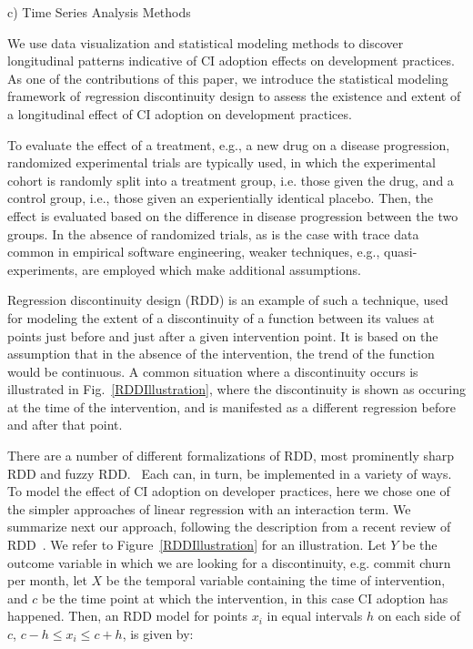c) Time Series Analysis Methods

We use data visualization and statistical modeling methods to discover longitudinal patterns indicative of CI adoption effects on development practices.
As one of the contributions of this paper, we introduce the statistical modeling framework of {\emph regression discontinuity design} to assess the existence and extent of a longitudinal effect of CI adoption on development practices.

To evaluate the effect of a treatment, e.g., a new drug on a disease progression, randomized experimental trials are typically used, in which the experimental cohort is randomly split into a treatment group, i.e. those given the drug, and a control group, i.e., those given an experientially identical placebo. Then, the effect is evaluated based on the difference in disease progression between the two groups.
In the absence of randomized trials, as is the case with trace data common in empirical software engineering, weaker techniques, e.g., quasi-experiments, are employed which make additional assumptions.

Regression discontinuity design (RDD) is an example of such a technique, used for modeling the extent of a discontinuity of a function between its values at points just before and just after a given intervention point. 
It is based on the assumption that in the absence of the intervention, the trend of the function would be continuous.
A common situation where a discontinuity occurs is illustrated in Fig.~\ref{RDDIllustration}, where the discontinuity is shown as occuring at the time of the intervention, and is manifested as a different regression before and after that point.

There are a number of different formalizations of RDD, most prominently sharp RDD and fuzzy RDD.~\cite{}
Each can, in turn, be implemented in a variety of ways.
To model the effect of CI adoption on developer practices, here we chose one of the simpler approaches of linear regression with an interaction term.
We summarize next our approach, following the description from a recent review of RDD~\cite{}. We refer to Figure~\ref{RDDIllustration} for an illustration.
Let $Y$ be the outcome variable in which we are looking for a discontinuity, e.g. commit churn per month, let $X$ be the temporal variable containing the time of intervention, and $c$ be the time point at which the intervention, in this case CI adoption has happened.
Then, an RDD model for points $x_i$ in equal intervals $h$ on each side of $c$, $c-h \le x_i \le c+h$, is given by:


